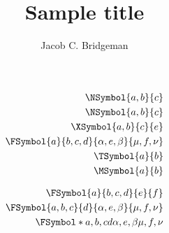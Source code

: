 \documentclass[a4paper,margin=2cm]{article}
\begin{document}
\title{Sample title}
\author{Jacob C. Bridgeman}


\maketitle

\begin{align}
	\NSymbol{a,b}{c} \\ 
	\NSymbol{a,b}{c}\\
	\XSymbol{a,b}{c}{e}\\
	\FSymbol{a}{b,c,d}{\alpha,e,\beta}{\mu,f,\nu} \\
	\TSymbol{a}{b}\\
	\MSymbol{a}{b}\\
\end{align}

\begin{align}
    \FSymbol{a}{b,c,d}{e}{f}\\
    \FSymbol{a,b,c}{d}{\alpha,e,\beta}{\mu,f,\nu}\\
    \FSymbol*{a,b,c}{d}{\alpha,e,\beta}{\mu,f,\nu}\\
\end{align}
\end{document}
